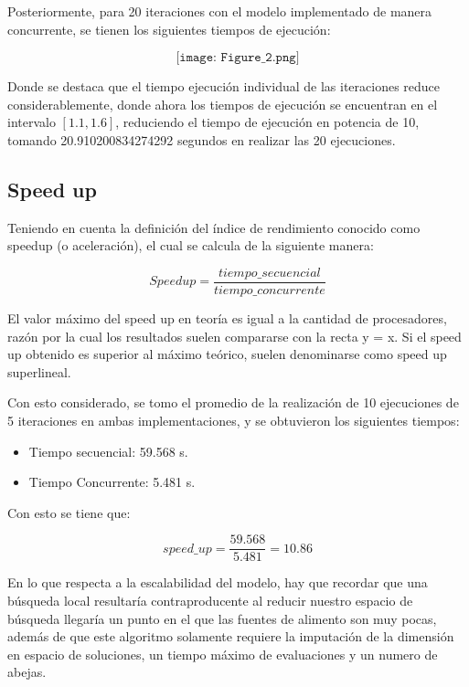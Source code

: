 \documentclass{article}
\begin{document}
\medskip

Posteriormente, para 20 iteraciones con el modelo implementado de manera concurrente, se tienen los siguientes tiempos de ejecución:

$$\texttt{[image: Figure\_2.png]}$$

Donde se destaca que el tiempo ejecución individual de las iteraciones reduce considerablemente, donde ahora los tiempos de ejecución se encuentran en el intervalo $[1.1,1.6]$, reduciendo el tiempo de ejecución en potencia de 10, tomando 20.910200834274292 segundos en realizar las 20 ejecuciones.  






\subsection{Speed up}

Teniendo en cuenta la definición del índice de rendimiento conocido como speedup (o aceleración), el cual se calcula de la siguiente manera:

$$ Speed up = \frac{tiempo\_secuencial}{tiempo\_concurrente} $$

El valor máximo del speed up en teoría es igual a la cantidad de procesadores, razón por la cual los resultados suelen compararse con la recta y = x. Si el speed up obtenido es superior al máximo teórico, suelen denominarse como speed up superlineal.

\medskip

Con esto considerado, se tomo el promedio de la realización de 10 ejecuciones de 5 iteraciones en ambas implementaciones, y se obtuvieron los siguientes tiempos:

\begin{itemize}
    \item Tiempo secuencial: 59.568 s. 
    \item Tiempo Concurrente: 5.481 s.
\end{itemize}

Con esto se tiene que:

$$speed\_up = \frac{59.568}{5.481}= 10.86$$

En lo que respecta a la escalabilidad del modelo, hay que recordar que  una búsqueda local resultaría contraproducente al reducir nuestro espacio de búsqueda llegaría un punto en el que las fuentes de alimento son muy pocas, además de que este algoritmo solamente requiere la imputación de la dimensión en espacio de soluciones, un tiempo máximo de evaluaciones y un numero de abejas. 
\end{document}
